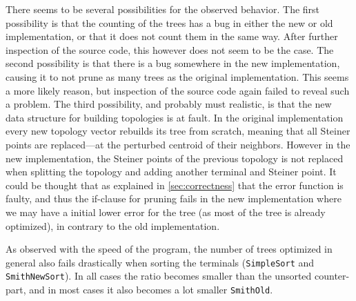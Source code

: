 There seems to be several possibilities for the observed behavior. The first
possibility is that the counting of the trees has a bug in either the new or old
implementation, or that it does not count them in the same way. After further
inspection of the source code, this however does not seem to be the case. The
second possibility is that there is a bug somewhere in the new implementation,
causing it to not prune as many trees as the original implementation. This seems
a more likely reason, but inspection of the source code again failed to reveal
such a problem. The third possibility, and probably must realistic, is that the
new data structure for building topologies is at fault. In the original
implementation every new topology vector rebuilds its tree from scratch, meaning
that all Steiner points are replaced---at the perturbed centroid of their
neighbors. However in the new implementation, the Steiner points of the previous
topology is not replaced when splitting the topology and adding another terminal
and Steiner point. It could be thought that as explained in
\cref{sec:correctness} that the error function is faulty, and thus the if-clause
for pruning fails in the new implementation where we may have a initial lower
error for the tree (as most of the tree is already optimized), in contrary to
the old implementation.

As observed with the speed of the program, the number of trees optimized in
general also fails drastically when sorting the terminals (\texttt{SimpleSort}
and \texttt{SmithNewSort}). In all cases the ratio becomes smaller than the
unsorted counter-part, and in most cases it also becomes a lot smaller
\texttt{SmithOld}.

